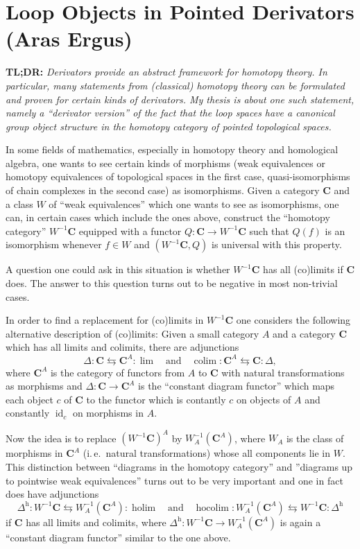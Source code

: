 \section{Loop Objects in Pointed Derivators (Aras Ergus)}

\textbf{TL;DR:} \emph{Derivators provide an abstract framework for homotopy
theory. In particular, many statements from (classical) homotopy theory
can be formulated and proven for certain kinds of derivators. My thesis
is about one such statement, namely a ``derivator version'' of the fact that
the loop spaces have a canonical group object structure in the homotopy
category of pointed topological spaces.}

In some fields of mathematics, especially in homotopy theory and
homological algebra, one wants to see certain kinds of morphisms
(weak equivalences or homotopy equivalences of topological spaces
in the first case, quasi-isomorphisms of chain complexes in the second
case) as isomorphisms. Given a category $\mathbf{C}$ and a class $W$
of ``weak equivalences'' which one wants to see as isomorphisms,
one can, in certain cases which include the ones above, construct the
``homotopy category'' $W^{-1}\mathbf{C}$ equipped with a functor
$Q \colon \mathbf{C} \to W^{-1}\mathbf{C}$ such that $Q(f)$ is
an isomorphism whenever $f \in W$ and $(W^{-1}\mathbf{C}, Q)$ is
universal with this property.

A question one could ask in this situation is whether $W^{-1}\mathbf{C}$
has all (co)limits if $\mathbf{C}$ does. The answer to this
question turns out to be negative in most non-trivial cases.

In order to find a replacement for (co)limits in $W^{-1}\mathbf{C}$
one considers the following alternative description of (co)limits:
Given a small category $A$ and a category $\mathbf{C}$ which has all limits
and colimits, there are adjunctions
\[
\Delta \colon \mathbf{C} \leftrightarrows \mathbf{C}^A \colon \lim
\quad \text{and} \quad
\operatorname{colim} \colon \mathbf{C}^A \leftrightarrows
\mathbf{C} \colon \Delta,
\]
where $\mathbf{C}^A$ is the category of functors from $A$ to $\mathbf{C}$
with natural transformations as morphisms and
$\Delta \colon \mathbf{C} \to \mathbf{C}^A$ is the ``constant diagram
functor'' which maps each object $c$ of $\mathbf{C}$ to the functor which is
contantly $c$ on objects of $A$ and constantly $\operatorname{id}_c$ on
morphisms in $A$.

Now the idea is to replace $(W^{-1}\mathbf{C})^A$ by
$W_A^{-1}(\mathbf{C}^A)$, where $W_A$ is the class of morphisms in
$\mathbf{C}^A$ (i.\,e.\ natural transformations) whose all components lie in
$W$. This distinction between ``diagrams in the homotopy category'' and
''diagrams up to pointwise weak equivalences'' turns out to be very important
and one in fact does have adjunctions
\[
\Delta^{\mathrm{h}} \colon W^{-1}\mathbf{C} \leftrightarrows
W_A^{-1}(\mathbf{C}^A) \colon \operatorname{holim}
\quad \text{and} \quad
\operatorname{hocolim} \colon W_A^{-1}(\mathbf{C}^A) \leftrightarrows
W^{-1}\mathbf{C} \colon \Delta^{\mathrm{h}}
\]
if $\mathbf{C}$ has all limits and colimits, where
$\Delta^{\mathrm{h}} \colon W^{-1}\mathbf{C} \to W_A^{-1}(\mathbf{C}^A)$ is
again a ``constant diagram functor'' similar to the one above.

